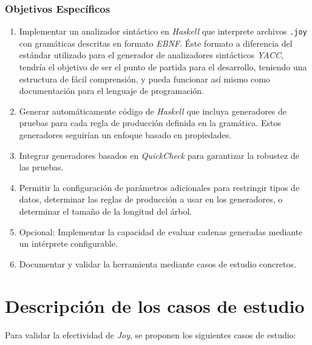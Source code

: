 \documentclass[11pt]{article}
\begin{document}
\subsubsection*{Objetivos Específicos}

\begin{enumerate}
\item Implementar un analizador sintáctico en \textit{Haskell} que interprete archivos \texttt{.joy} con gramáticas descritas en formato \textit{EBNF}. Éste formato a diferencia del estándar utilizado para el generador de analizadores sintácticos \textit{YACC}, tendría el objetivo de ser el punto de partida para el desarrollo, teniendo una estructura de fácil comprensión, y pueda funcionar así mismo como documentación para el lenguaje de programación.
\item Generar automáticamente código de \textit{Haskell} que incluya generadores de pruebas para cada regla de producción definida en la gramática. Estos generadores seguirían un enfoque basado en propiedades.
\item Integrar generadores basados en \textit{QuickCheck} para garantizar la robustez de las pruebas.
\item Permitir la configuración de parámetros adicionales para restringir tipos de datos, determinar las reglas de producción a usar en los generadores, o determinar el tamaño de la longitud del árbol.
\item Opcional: Implementar la capacidad de evaluar cadenas generadas mediante un intérprete configurable.
\item Documentar y validar la herramienta mediante casos de estudio concretos.
\end{enumerate}

\section*{Descripción de los casos de estudio}

Para validar la efectividad de \textit{Joy}, se proponen los siguientes casos de estudio:
\end{document}
